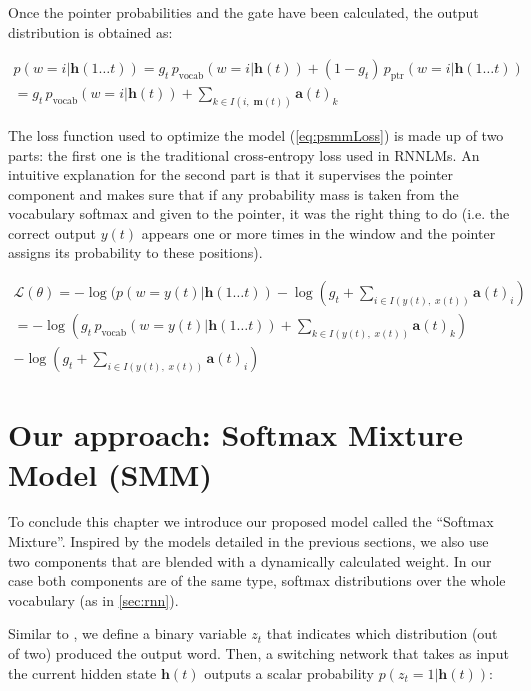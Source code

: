 Once the pointer probabilities and the gate have been calculated, the output distribution is obtained as:

\begin{equation}
	\begin{gathered}
		p(w=i|\mathbf{h}(1\ldots t)) = g_t \, p_{\text{vocab}}(w=i|\mathbf{h}(t)) + (1-g_t) \, p_{\text{ptr}}(w=i|\mathbf{h}(1\ldots t)) \\
		= g_t \, p_{\text{vocab}}(w=i|\mathbf{h}(t)) + \sum_{k \in I(i, \; \mathbf{m}(t))}\mathbf{a}(t)_k
	\end{gathered}
\end{equation}

The loss function used to optimize the model (\autoref{eq:psmmLoss}) is made up of two parts: the first one is the traditional cross-entropy loss used in RNNLMs. An intuitive explanation for the second part is that it supervises the pointer component and makes sure that if any probability mass is taken from the vocabulary softmax and given to the pointer, it was the right thing to do (i.e. the correct output $y(t)$ appears one or more times in the window and the pointer assigns its probability to these positions).

\begin{equation} \label{eq:psmmLoss}
	\begin{gathered}
		\mathcal{L}(\theta) = -\log(p(w=y(t)|\mathbf{h}(1\ldots t)) -\log(g_t + \sum_{i \in I(y(t), \; x(t))}\mathbf{a}(t)_i) \\
		= -\log(g_t \, p_{\text{vocab}}(w=y(t)|\mathbf{h}(1\ldots t)) + \sum_{k \in I(y(t), \; x(t))}\mathbf{a}(t)_k) \\
		-\log(g_t + \sum_{i \in I(y(t), \; x(t))}\mathbf{a}(t)_i)
	\end{gathered}
\end{equation}

\section{Our approach: Softmax Mixture Model (SMM)}
\label{sec:mixtureModel}

To conclude this chapter we introduce our proposed model called the ``Softmax Mixture''. Inspired by the models detailed in the previous sections, we also use two components that are blended with a dynamically calculated weight. In our case both components are of the same type, softmax distributions over the whole vocabulary (as in \autoref{sec:rnn}).

Similar to \cite{gulcehre2016pointing}, we define a binary variable $z_t$ that indicates which distribution (out of two)  produced the output word. Then, a switching network that takes as input the current hidden state $\mathbf{h}(t)$ outputs a scalar probability $p(z_t=1|\mathbf{h}(t))$:

